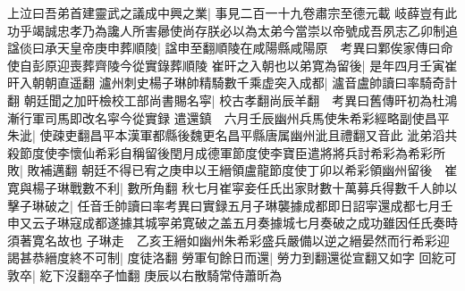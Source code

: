 上泣曰吾弟首建靈武之議成中興之業|{
	事見二百一十九卷肅宗至德元載}
岐薛豈有此功乎竭誠忠孝乃為讒人所害曏使尚存朕必以為太弟今當崇以帝號成吾夙志乙卯制追諡倓曰承天皇帝庚申葬順陵|{
	諡申至翻順陵在咸陽縣咸陽原　考異曰鄴俟家傳曰命使自彭原迎喪葬齊陵今從實錄葬順陵}
崔旰之入朝也以弟寛為留後|{
	是年四月壬寅崔旰入朝朝直遥翻}
瀘州刺史楊子琳帥精騎數千乘虚突入成都|{
	瀘音盧帥讀曰率騎奇計翻}
朝廷聞之加旰檢校工部尚書賜名寜|{
	校古孝翻尚辰羊翻　考異曰舊傳旰初為杜鴻漸行軍司馬即改名寜今從實録}
遣還鎮　六月壬辰幽州兵馬使朱希彩經略副使昌平朱泚|{
	使疎吏翻昌平本漢軍都縣後魏更名昌平縣唐属幽州泚且禮翻又音此}
泚弟滔共殺節度使李懷仙希彩自稱留後閏月成德軍節度使李寶臣遣將將兵討希彩為希彩所敗|{
	敗補邁翻}
朝廷不得已宥之庚申以王縉領盧龍節度使丁卯以希彩領幽州留後　崔寛與楊子琳戰數不利|{
	數所角翻}
秋七月崔寜妾任氏出家財數十萬募兵得數千人帥以擊子琳破之|{
	任音壬帥讀曰率考異曰實録五月子琳襲據成都即日詔寜還成都七月壬申又云子琳寇成都遂據其城寜弟寛破之盖五月奏據城七月奏破之成功雖因任氏奏時須著寛名故也}
子琳走　乙亥王縉如幽州朱希彩盛兵嚴備以逆之縉晏然而行希彩迎謁甚恭縉度終不可制|{
	度徒洛翻}
勞軍旬餘日而還|{
	勞力到翻還從宣翻又如字}
回紇可敦卒|{
	紇下沒翻卒子恤翻}
庚辰以右散騎常侍蕭昕為

